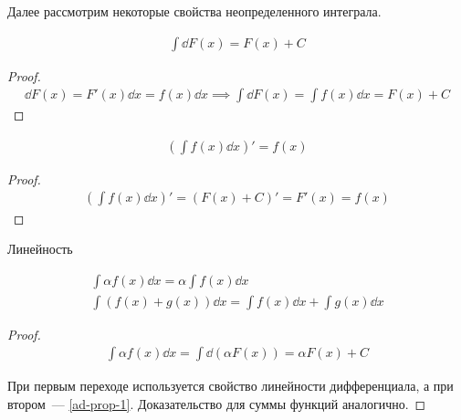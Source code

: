 Далее рассмотрим некоторые свойства неопределенного интеграла.

\begin{lemma}\label{ad-prop-1}
  \begin{align*}
    \int \dd F(x) = F(x) + C
  \end{align*}
\end{lemma}
\begin{proof}
  \begin{align*}
    \dd F(x) = F'(x) \dd x = f(x) \dd x
    \implies
    \int \dd F(x) = \int f(x) \dd x = F(x) + C
  \end{align*}
\end{proof}

\begin{lemma}\label{ad-prop-2}
  \begin{align*}
    \left( \int f(x) \dd x \right)' = f(x)
  \end{align*}
\end{lemma}
\begin{proof}
  \begin{align*}
    \left( \int f(x) \dd x \right)' = (F(x) + C)' = F'(x) = f(x)
  \end{align*}
\end{proof}

\begin{lemma}\label{ad-prop-3}
  Линейность

  \begin{align*}
    \int \alpha f(x) \dd x = \alpha \int f(x) \dd x \\
    \int (f(x) + g(x)) \dd x = \int f(x) \dd x + \int g(x) \dd x
  \end{align*}
\end{lemma}
\begin{proof}
  \begin{align*}
    \int \alpha f(x) \dd x
    = \int \dd (\alpha F(x))
    = \alpha F(x) + C
  \end{align*}

  При первым переходе используется свойство линейности дифференциала,
  а при втором~--- \ref{ad-prop-1}. Доказательство для суммы функций аналогично.
\end{proof}
